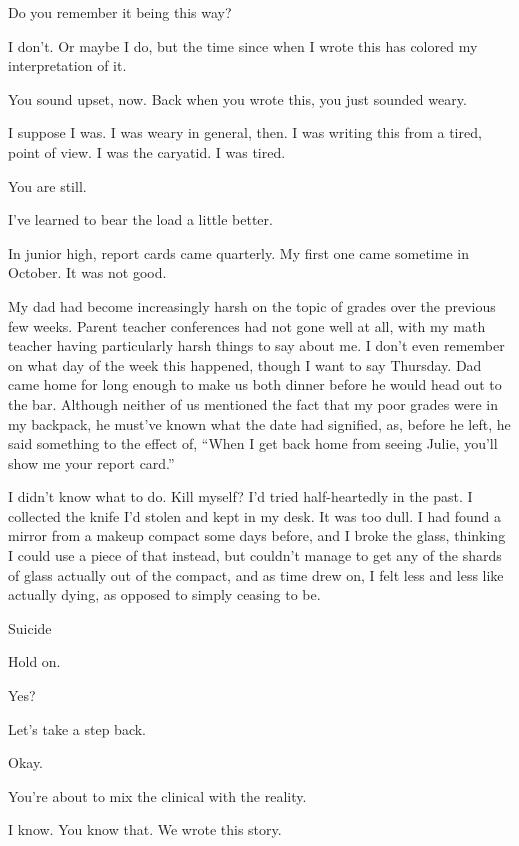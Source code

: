 \begin{paracol}{2}
\begin{leftcolumn}
\begin{ally}
Do you remember it being this way?
\end{ally}
I don't. Or maybe I do, but the time since when I wrote this has colored my interpretation of it.

\begin{ally}
You sound upset, now. Back when you wrote this, you just sounded weary.
\end{ally}
I suppose I was. I was weary in general, then. I was writing this from a tired, point of view. I was the caryatid. I was tired.

\begin{ally}
You are still.
\end{ally}
I've learned to bear the load a little better.

In junior high, report cards came quarterly. My first one came sometime in October. It was not good.

My dad had become increasingly harsh on the topic of grades over the previous few weeks. Parent teacher conferences had not gone well at all, with my math teacher having particularly harsh things to say about me. I don't even remember on what day of the week this happened, though I want to say Thursday. Dad came home for long enough to make us both dinner before he would head out to the bar. Although neither of us mentioned the fact that my poor grades were in my backpack, he must've known what the date had signified, as, before he left, he said something to the effect of, ``When I get back home from seeing Julie, you'll show me your report card.''

I didn't know what to do. Kill myself? I'd tried half-heartedly in the past. I collected the knife I'd stolen and kept in my desk. It was too dull. I had found a mirror from a makeup compact some days before, and I broke the glass, thinking I could use a piece of that instead, but couldn't manage to get any of the shards of glass actually out of the compact, and as time drew on, I felt less and less like actually dying, as opposed to simply ceasing to be.
\newpage

Suicide

\begin{ally}
Hold on.
\end{ally}
Yes?

\begin{ally}
Let's take a step back.
\end{ally}
Okay.

\begin{ally}
You're about to mix the clinical with the reality.
\end{ally}
I know. You know that. We wrote this story.


\end{leftcolumn}
\end{paracol}
